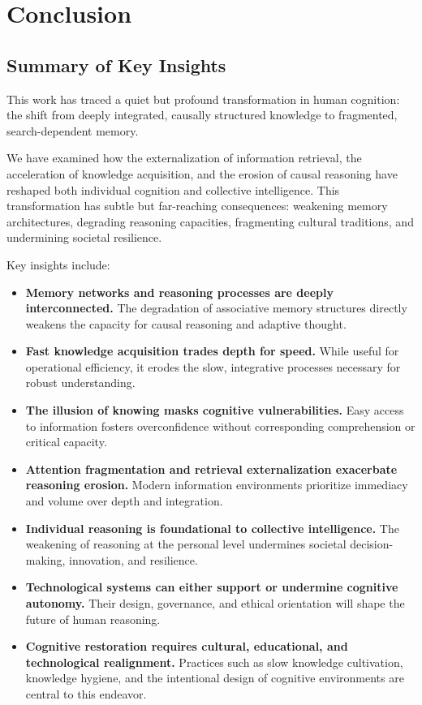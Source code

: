 \chapter{Conclusion}

\section{Summary of Key Insights}

This work has traced a quiet but profound transformation in human
cognition: the shift from deeply integrated, causally structured
knowledge to fragmented, search-dependent memory.

We have examined how the externalization of information retrieval, the
acceleration of knowledge acquisition, and the erosion of causal
reasoning have reshaped both individual cognition and collective
intelligence. This transformation has subtle but far-reaching
consequences: weakening memory architectures, degrading reasoning
capacities, fragmenting cultural traditions, and undermining societal
resilience.

Key insights include:

\begin{itemize} \item \textbf{Memory networks and reasoning processes are deeply interconnected.} 
  The degradation of associative memory structures directly weakens 
  the capacity for causal reasoning and adaptive thought.
  
  \item \textbf{Fast knowledge acquisition trades depth for speed.} 
  While useful for operational efficiency, it erodes the slow, integrative processes necessary for
  robust understanding.
  
  \item \textbf{The illusion of knowing masks cognitive
    vulnerabilities.} Easy access to information fosters
  overconfidence without corresponding comprehension or
  critical capacity.
  
  \item \textbf{Attention fragmentation and retrieval
    externalization exacerbate reasoning erosion.} Modern
  information environments prioritize immediacy and volume
  over depth and integration.
  
  \item \textbf{Individual reasoning is foundational to collective
    intelligence.} The weakening of reasoning at the
  personal level undermines societal decision-making,
  innovation, and resilience.
  
  \item \textbf{Technological systems can either support or
    undermine cognitive autonomy.} Their design, governance,
  and ethical orientation will shape the future of human
  reasoning.
  
  \item \textbf{Cognitive restoration requires cultural,
    educational, and technological realignment.} Practices
  such as slow knowledge cultivation, knowledge hygiene,
  and the intentional design of cognitive environments are
  central to this endeavor.
  
\end{itemize}

